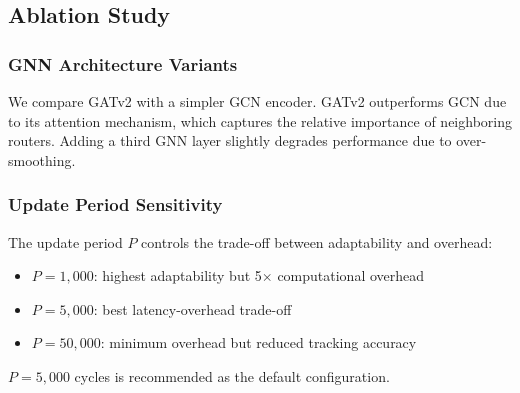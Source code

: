 \subsection{Ablation Study}

\subsubsection{GNN Architecture Variants}

We compare GATv2 with a simpler GCN encoder. GATv2 outperforms GCN due to its attention mechanism, which captures the relative importance of neighboring routers. Adding a third GNN layer slightly degrades performance due to over-smoothing.

\subsubsection{Update Period Sensitivity}

The update period $P$ controls the trade-off between adaptability and overhead:
\begin{itemize}
    \item $P = 1,000$: highest adaptability but 5$\times$ computational overhead
    \item $P = 5,000$: best latency-overhead trade-off
    \item $P = 50,000$: minimum overhead but reduced tracking accuracy
\end{itemize}

$P = 5,000$ cycles is recommended as the default configuration.
